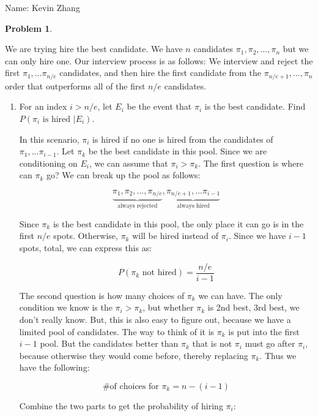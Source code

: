 \documentclass[11pt]{article}
\newcommand{\yourname}{Kevin Zhang}
\theoremstyle{definition}
\theoremstyle{case}
\theoremstyle{theorem}
\newtheorem{prob}{Problem}
\begin{document}
{\large
\noindent Name: \yourname}

\vspace{15pt}

\begin{prob}
\end{prob}

We are trying hire the best candidate. We have $n$ candidates $\pi_1, \pi_2, ..., \pi_n$ but we can only hire one.
Our interview process is as follows: We interview and reject the first $\pi_1, ... \pi_{n/e}$ candidates, and then
hire the first candidate from the $\pi_{n/e+1}, ..., \pi_n$ order that outperforms all of the first $n/e$ candidates.

\begin{enumerate}[label=(\alph*)]

\item For an index $i > n/e$, let $E_i$ be the event that $\pi_i$ is the best candidate. Find $P(\pi_i \text{ is hired } | E_i)$.

In this scenario, $\pi_i$ is hired if no one is hired from the candidates of $\pi_1, ... \pi_{i-1}$. Let $\pi_k$ be the best
candidate in this pool. Since we are conditioning on $E_i$, we can assume that $\pi_i > \pi_k$. The first question is where
can $\pi_k$ go? We can break up the pool as follows:

\[
  \underbrace{\pi_1, \pi_2, ..., \pi_{n/e}}_{\text{always rejected}}, \underbrace{\pi_{n/e+1}, ... \pi_{i-1}}_{\text{always hired}}
\] 

Since $\pi_k$ is the best candidate in this pool, the only place it can go is in the first $n/e$ spots. Otherwise, $\pi_k$ will be
hired instead of $\pi_i$. Since we have $i-1$ spots, total, we can express this as:

\[
  P(\pi_k \text{ not hired}) = \frac{n/e}{i-1}
\]

The second question is how many choices of $\pi_k$ we can have. The only condition we know is the $\pi_i > \pi_k$, but whether
$\pi_k$ is 2nd best, 3rd best, we don't really know. But, this is also easy to figure out, because we have a limited pool of 
candidates. The way to think of it is $\pi_k$ is put into the first $i-1$ pool. But the candidates better than $\pi_k$ that is not
$\pi_i$ must go after $\pi_i$, because otherwise they would come before, thereby replacing $\pi_k$. Thus we have the following:

\[
  \text{\# of choices for $\pi_k$} = n - (i-1)
\]

Combine the two parts to get the probability of hiring $\pi_i$:


\end{enumerate}
\end{document}

